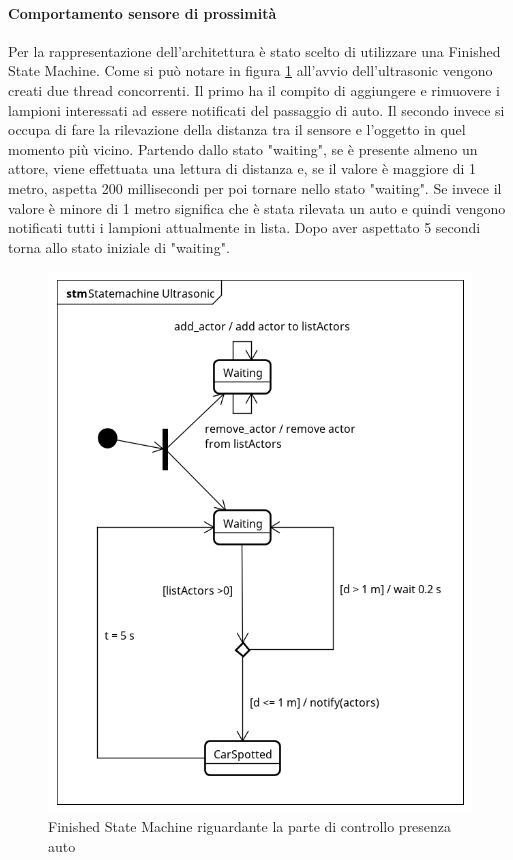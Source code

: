 \paragraph{Comportamento sensore di prossimità}
Per la rappresentazione dell'architettura è stato scelto di utilizzare una Finished State Machine.
Come si può notare in figura \ref{FSM CAR} all'avvio dell'ultrasonic vengono creati due thread concorrenti. Il primo ha il compito di aggiungere e rimuovere i lampioni interessati ad essere notificati del passaggio di auto.
Il secondo invece si occupa di fare la rilevazione della distanza tra il sensore e l'oggetto in quel momento più vicino. Partendo dallo stato "waiting", se è presente almeno un attore, viene effettuata una lettura di distanza e, se il valore è maggiore di 1 metro, aspetta 200 millisecondi per poi tornare nello stato "waiting". Se invece il valore è minore di 1 metro significa che è stata rilevata un auto e quindi vengono notificati tutti i lampioni attualmente in lista. Dopo aver aspettato 5 secondi torna allo stato iniziale di "waiting".
\begin{figure}[tbp]
	\centering
	\includegraphics[scale=.75]{figure/Statemachine_Ultrasonic.png}
	\caption{Finished State Machine riguardante la parte di controllo presenza auto \label{FSM CAR}}
\end{figure}
